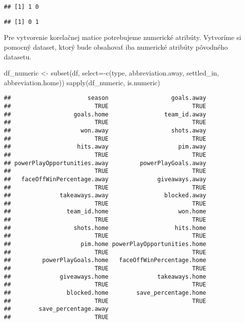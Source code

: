 \documentclass[
]{article}
\newenvironment{Shaded}{\begin{snugshade}}{\end{snugshade}}
\newcommand{\AttributeTok}[1]{\textcolor[rgb]{0.77,0.63,0.00}{#1}}
\newcommand{\FunctionTok}[1]{\textcolor[rgb]{0.00,0.00,0.00}{#1}}
\newcommand{\NormalTok}[1]{#1}
\newcommand{\OtherTok}[1]{\textcolor[rgb]{0.56,0.35,0.01}{#1}}
\newcommand{\SpecialCharTok}[1]{\textcolor[rgb]{0.00,0.00,0.00}{#1}}
\begin{document}
\begin{verbatim}
## [1] 1 0
\end{verbatim}

\begin{Shaded}
\end{Shaded}

\begin{verbatim}
## [1] 0 1
\end{verbatim}

Pre vytvorenie korelačnej matice potrebujeme numerické atribúty.
Vytvoríme si pomocný dataset, ktorý bude obsahovať iba numerické
atribúty pôvodného datasetu.

\begin{Shaded}
\begin{Highlighting}[]
\NormalTok{df\_numeric }\OtherTok{\textless{}{-}} \FunctionTok{subset}\NormalTok{(df, }\AttributeTok{select=}\SpecialCharTok{{-}}\FunctionTok{c}\NormalTok{(type, abbreviation.away, settled\_in, abbreviation.home))}
\FunctionTok{sapply}\NormalTok{(df\_numeric, is.numeric)}
\end{Highlighting}
\end{Shaded}

\begin{verbatim}
##                      season                  goals.away 
##                        TRUE                        TRUE 
##                  goals.home                team_id.away 
##                        TRUE                        TRUE 
##                    won.away                  shots.away 
##                        TRUE                        TRUE 
##                   hits.away                    pim.away 
##                        TRUE                        TRUE 
## powerPlayOpportunities.away         powerPlayGoals.away 
##                        TRUE                        TRUE 
##   faceOffWinPercentage.away              giveaways.away 
##                        TRUE                        TRUE 
##              takeaways.away                blocked.away 
##                        TRUE                        TRUE 
##                team_id.home                    won.home 
##                        TRUE                        TRUE 
##                  shots.home                   hits.home 
##                        TRUE                        TRUE 
##                    pim.home powerPlayOpportunities.home 
##                        TRUE                        TRUE 
##         powerPlayGoals.home   faceOffWinPercentage.home 
##                        TRUE                        TRUE 
##              giveaways.home              takeaways.home 
##                        TRUE                        TRUE 
##                blocked.home        save_percentage.home 
##                        TRUE                        TRUE 
##        save_percentage.away 
##                        TRUE
\end{verbatim}
\end{document}
